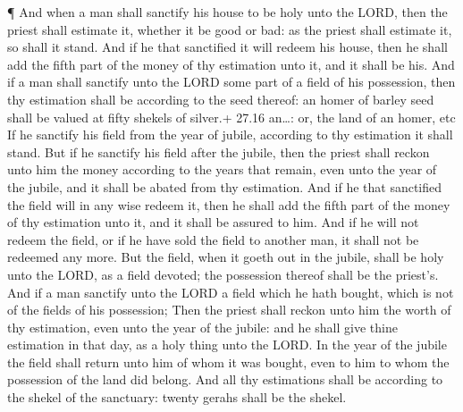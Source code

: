  ¶ And when a man shall sanctify his house to be holy unto
the LORD, then the priest shall estimate it, whether it be good or bad:
as the priest shall estimate it, so shall it stand.  And if
he that sanctified it will redeem his house, then he shall add the fifth
part of the money of thy estimation unto it, and it shall be his.
 And if a man shall sanctify unto the LORD some part of a
field of his possession, then thy estimation shall be according to the
seed thereof: an homer of barley seed shall be valued at fifty shekels
of silver.+ 27.16 an\ldots: or, the land of an homer, etc 
If he sanctify his field from the year of jubile, according to thy
estimation it shall stand.  But if he sanctify his field
after the jubile, then the priest shall reckon unto him the money
according to the years that remain, even unto the year of the jubile,
and it shall be abated from thy estimation.  And if he that
sanctified the field will in any wise redeem it, then he shall add the
fifth part of the money of thy estimation unto it, and it shall be
assured to him.  And if he will not redeem the field, or if
he have sold the field to another man, it shall not be redeemed any
more.  But the field, when it goeth out in the jubile,
shall be holy unto the LORD, as a field devoted; the possession thereof
shall be the priest's.  And if a man sanctify unto the LORD
a field which he hath bought, which is not of the fields of his
possession;  Then the priest shall reckon unto him the
worth of thy estimation, even unto the year of the jubile: and he shall
give thine estimation in that day, as a holy thing unto the LORD.
 In the year of the jubile the field shall return unto him
of whom it was bought, even to him to whom the possession of the land
did belong.  And all thy estimations shall be according to
the shekel of the sanctuary: twenty gerahs shall be the shekel.

